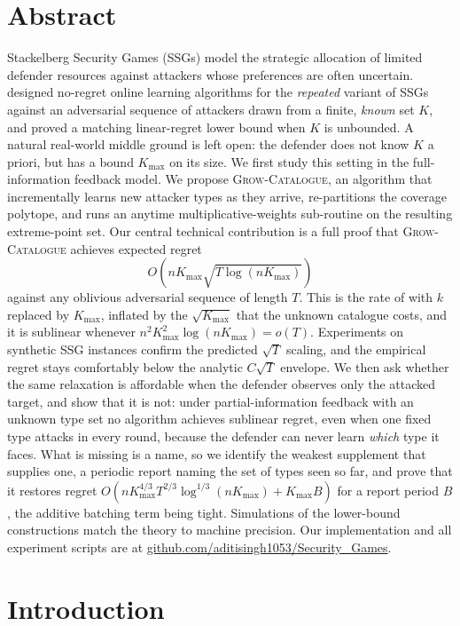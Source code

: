 \documentclass[letterpaper,9pt,twocolumn]{extarticle}
\newcommand{\Kmax}{K_{\max}}
\theoremstyle{plain}
\theoremstyle{definition}
\theoremstyle{remark}
\begin{document}
\section{Abstract}
\label{sec:Abstract}
Stackelberg Security Games (SSGs) model the strategic allocation of limited
defender resources against attackers whose preferences are often uncertain.
\citet{balcan2015} designed no-regret online learning algorithms for the
\emph{repeated} variant of SSGs against an adversarial sequence of attackers
drawn from a finite, \emph{known} set $K$, and proved a matching linear-regret
lower bound when $K$ is unbounded. A natural real-world middle ground is
left open: the defender does not know $K$ a priori, but has a bound $\Kmax$
on its size. We first study this setting in the full-information
feedback model.
We propose \textsc{Grow-Catalogue}, an algorithm that incrementally learns
new attacker types as they arrive, re-partitions the coverage polytope, and
runs an anytime multiplicative-weights sub-routine on the resulting
extreme-point set. Our central technical contribution is a full proof that
\textsc{Grow-Catalogue} achieves expected regret
\[
O\!\left(n\Kmax\sqrt{T\log (n\Kmax)}\right)
\]
against any oblivious adversarial sequence of length $T$. This is the rate of
\citet{balcan2015} with $k$ replaced by $\Kmax$, inflated by the $\sqrt{\Kmax}$
that the unknown catalogue costs, and it is sublinear whenever
$n^2\Kmax^2\log(n\Kmax)=o(T)$. Experiments on synthetic SSG
instances confirm the predicted $\sqrt{T}$ scaling, and the empirical regret
stays comfortably below the analytic $C\sqrt{T}$ envelope.
We then ask whether the same relaxation is affordable when the defender
observes only the attacked target, and show that it is not: under
partial-information feedback with an unknown type set no algorithm achieves
sublinear regret, even when one fixed type attacks in every round, because
the defender can never learn \emph{which} type it faces. What is missing is
a name, so we identify the weakest supplement that supplies one, a
periodic report naming the set of types seen so far, and prove that it
restores regret
$O(n\Kmax^{4/3}T^{2/3}\log^{1/3}(n\Kmax)+\Kmax B)$ for a report period
$B$, the additive batching term being tight. Simulations of the lower-bound
constructions match the theory to machine precision.
Our implementation and all experiment scripts are at
\textcolor{blue}{\href{https://github.com/aditisingh1053/Security_Games}{github.com/aditisingh1053/Security\_Games}}.

\section{Introduction}
\label{sec:intro}
\end{document}
